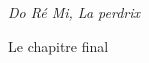 \documentclass[preview]{standalone}
\begin{document}
\begin{center}
\em{Do Ré Mi, La perdrix}
    
Le chapitre final
\end{center}
\end{document}
